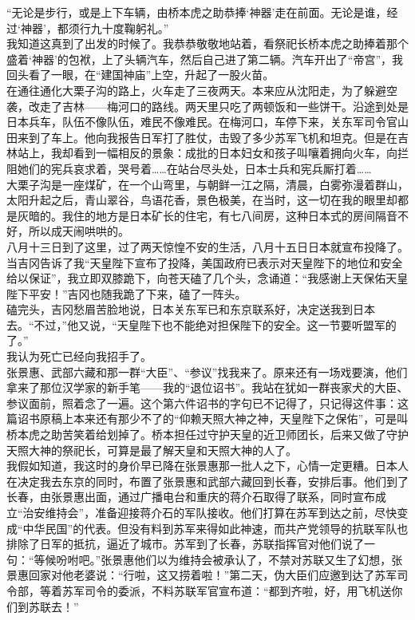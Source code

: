“无论是步行，或是上下车辆，由桥本虎之助恭捧‘神器’走在前面。无论是谁，经过‘神器’，都须行九十度鞠躬礼。”\\

我知道这真到了出发的时候了。我恭恭敬敬地站着，看祭祀长桥本虎之助捧着那个盛着‘神器’的包袱，上了头辆汽车，然后自己进了第二辆。汽车开出了“帝宫”，我回头看了一眼，在“建国神庙”上空，升起了一股火苗。\\

在通往通化大栗子沟的路上，火车走了三夜两天。本来应从沈阳走，为了躲避空袭，改走了吉林——梅河口的路线。两天里只吃了两顿饭和一些饼干。沿途到处是日本兵车，队伍不像队伍，难民不像难民。在梅河口，车停下来，关东军司令官山田来到了车上。他向我报告日军打了胜仗，击毁了多少苏军飞机和坦克。但是在吉林站上，我却看到一幅相反的景象：成批的日本妇女和孩子叫嚷着拥向火车，向拦阻她们的宪兵哀求着，哭号着……在站台尽头处，日本士兵和宪兵厮打着……\\

大栗子沟是一座煤矿，在一个山弯里，与朝鲜一江之隔，清晨，白雾弥漫着群山，太阳升起之后，青山翠谷，鸟语花香，景色极美，在当时，这一切在我的眼里却都是灰暗的。我住的地方是日本矿长的住宅，有七八间房，这种日本式的房间隔音不好，所以成天闹哄哄的。\\

八月十三日到了这里，过了两天惊惶不安的生活，八月十五日日本就宣布投降了。\\

当吉冈告诉了我“天皇陛下宣布了投降，美国政府已表示对天皇陛下的地位和安全给以保证”，我立即双膝跪下，向苍天磕了几个头，念诵道：“我感谢上天保佑天皇陛下平安！”吉冈也随我跪了下来，磕了一阵头。\\

磕完头，吉冈愁眉苦脸地说，日本关东军已和东京联系好，决定送我到日本去。“不过，”他又说，“天皇陛下也不能绝对担保陛下的安全。这一节要听盟军的了。”\\

我认为死亡已经向我招手了。\\

张景惠、武部六藏和那一群“大臣”、“参议”找我来了。原来还有一场戏要演，他们拿来了那位汉学家的新手笔——我的“退位诏书”。我站在犹如一群丧家犬的大臣、参议面前，照着念了一遍。这个第六件诏书的字句已不记得了，只记得这件事：这篇诏书原稿上本来还有那少不了的“仰赖天照大神之神，天皇陛下之保佑”，可是叫桥本虎之助苦笑着给划掉了。桥本担任过守护天皇的近卫师团长，后来又做了守护天照大神的祭祀长，可算是最了解天皇和天照大神的人了。\\

我假如知道，我这时的身价早已降在张景惠那一批人之下，心情一定更糟。日本人在决定我去东京的同时，布置了张景惠和武部六藏回到长春，安排后事。他们到了长春，由张景惠出面，通过广播电台和重庆的蒋介石取得了联系，同时宣布成立“治安维持会”，准备迎接蒋介石的军队接收。他们打算在苏军到达之前，尽快变成“中华民国”的代表。但没有料到苏军来得如此神速，而共产党领导的抗联军队也排除了日军的抵抗，逼近了城市。苏军到了长春，苏联指挥官对他们说了一句：“等候吩咐吧。”张景惠他们以为维持会被承认了，不禁对苏联又生了幻想，张景惠回家对他老婆说：“行啦，这又捞着啦！”第二天，伪大臣们应邀到达了苏军司令部，等着苏军司令的委派，不料苏联军官宣布道：“都到齐啦，好，用飞机送你们到苏联去！”\\

